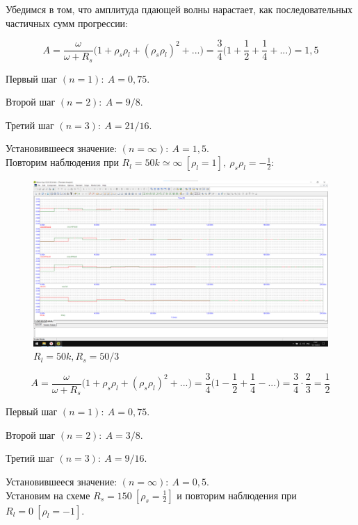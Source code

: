 \documentclass[a4paper, 12pt]{article}
\begin{document}
    Убедимся в том, что амплитуда пдающей волны нарастает, как последовательных частичных сумм прогрессии:

    \[A = \frac{\omega}{\omega + R_s} \Big( 1 + \rho_s \rho_l + (\rho_s \rho_l)^2 + ...\Big) = \frac{3}{4} \Big( 1 + \frac{1}{2} + \frac{1}{4} + ... \Big) = 1,5\]

    Первый шаг $(n = 1): \: A = 0,75$.
    
    Второй шаг $(n = 2): \: A = 9/8$.
    
    Третий шаг $(n = 3): \: A = 21/16$.

    Установившееся значение: $(n = \infty): \: A = 1,5$.\\

    Повторим наблюдения при $R_l = 50k \simeq \infty \: [\rho_l = 1], \: \rho_s \rho_l = -\frac{1}{2}$:

    \begin{figure}[H]
    \centering
    \includegraphics[width = 14 cm]{images/Graph9.png}
    \caption{$R_l = 50k, R_s = 50/3$}
    \end{figure}

    \[A = \frac{\omega}{\omega + R_s} \Big( 1 + \rho_s \rho_l + (\rho_s \rho_l)^2 + ...\Big) = \frac{3}{4} \Big( 1 - \frac{1}{2} + \frac{1}{4} - ... \Big) = \frac{3}{4} \cdot \frac{2}{3} = \frac{1}{2}\]

    Первый шаг $(n = 1): \: A = 0,75$.
    
    Второй шаг $(n = 2): \: A = 3/8$.
    
    Третий шаг $(n = 3): \: A = 9/16$.
    
    Установившееся значение: $(n = \infty): \: A = 0,5$.\\
    
    Установим на схеме $R_s = 150 \: [\rho_s = \frac{1}{2}]$ и повторим наблюдения при $R_l = 0 \:[\rho_l = -1]$.
\end{document}
